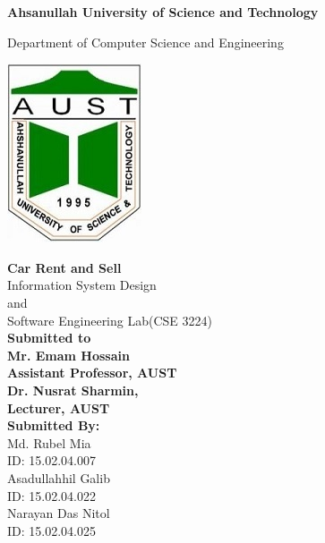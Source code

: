 \documentclass[10pt,twosides]{report}
\begin{document}
\begin{center}
		\large \textbf{Ahsanullah University of Science and Technology} 
		
		Department of Computer Science and Engineering
		\vspace{0.1in}
	\end{center}
	\begin{center}
		\includegraphics[scale=0.4]{figures/logo}
	\end{center}
	\begin{center}
		\large \textbf {Car Rent and Sell}
		\vspace{0.3in}
		\\
		Information System Design    
		\\
		and
		\\
		Software Engineering Lab(CSE 3224)
		\vspace{0.3in}
		\\ \textbf{Submitted to }
		\vspace{0.1in}
		\\ \textbf{Mr. Emam Hossain}
		\\ \textbf{Assistant Professor, AUST}
		\vspace{0.1in}
		\\ \textbf{Dr. Nusrat Sharmin, }
		\\ \textbf{Lecturer, AUST}
		\vspace{0.2in}
		\\ \textbf{ Submitted By:}
		\vspace{0.1in}
		\\ {Md. Rubel Mia}
		\\ {ID: 15.02.04.007}
		\\ {Asadullahhil Galib}
		\\ {ID: 15.02.04.022}
		\\ {Narayan Das Nitol}
		\\ {ID: 15.02.04.025}
		
		
	\end{center}
	\pagebreak
\end{document}
